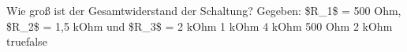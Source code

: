     {Wie groß ist der Gesamtwiderstand der Schaltung? Gegeben: \$R\_1\$ = 500 Ohm, \$R\_2\$ = 1,5 kOhm und \$R\_3\$ = 2 kOhm}
    {1 kOhm}
    {4 kOhm}
    {500 Ohm}
    {2 kOhm}
    {true}{false}